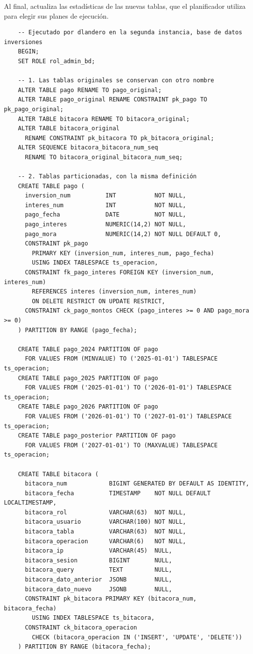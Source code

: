Al final,  actualiza las estadísticas de las nuevas tablas, que el planificador utiliza para elegir sus planes de ejecución.

\begin{verbatim}
	-- Ejecutado por dlandero en la segunda instancia, base de datos inversiones
	BEGIN;
	SET ROLE rol_admin_bd;
	
	-- 1. Las tablas originales se conservan con otro nombre
	ALTER TABLE pago RENAME TO pago_original;
	ALTER TABLE pago_original RENAME CONSTRAINT pk_pago TO pk_pago_original;
	ALTER TABLE bitacora RENAME TO bitacora_original;
	ALTER TABLE bitacora_original
	  RENAME CONSTRAINT pk_bitacora TO pk_bitacora_original;
	ALTER SEQUENCE bitacora_bitacora_num_seq
	  RENAME TO bitacora_original_bitacora_num_seq;
	
	-- 2. Tablas particionadas, con la misma definición
	CREATE TABLE pago (
	  inversion_num          INT           NOT NULL,
	  interes_num            INT           NOT NULL,
	  pago_fecha             DATE          NOT NULL,
	  pago_interes           NUMERIC(14,2) NOT NULL,
	  pago_mora              NUMERIC(14,2) NOT NULL DEFAULT 0,
	  CONSTRAINT pk_pago
	    PRIMARY KEY (inversion_num, interes_num, pago_fecha)
	    USING INDEX TABLESPACE ts_operacion,
	  CONSTRAINT fk_pago_interes FOREIGN KEY (inversion_num, interes_num)
	    REFERENCES interes (inversion_num, interes_num)
	    ON DELETE RESTRICT ON UPDATE RESTRICT,
	  CONSTRAINT ck_pago_montos CHECK (pago_interes >= 0 AND pago_mora >= 0)
	) PARTITION BY RANGE (pago_fecha);
	
	CREATE TABLE pago_2024 PARTITION OF pago
	  FOR VALUES FROM (MINVALUE) TO ('2025-01-01') TABLESPACE ts_operacion;
	CREATE TABLE pago_2025 PARTITION OF pago
	  FOR VALUES FROM ('2025-01-01') TO ('2026-01-01') TABLESPACE ts_operacion;
	CREATE TABLE pago_2026 PARTITION OF pago
	  FOR VALUES FROM ('2026-01-01') TO ('2027-01-01') TABLESPACE ts_operacion;
	CREATE TABLE pago_posterior PARTITION OF pago
	  FOR VALUES FROM ('2027-01-01') TO (MAXVALUE) TABLESPACE ts_operacion;
	
	CREATE TABLE bitacora (
	  bitacora_num            BIGINT GENERATED BY DEFAULT AS IDENTITY,
	  bitacora_fecha          TIMESTAMP    NOT NULL DEFAULT LOCALTIMESTAMP,
	  bitacora_rol            VARCHAR(63)  NOT NULL,
	  bitacora_usuario        VARCHAR(100) NOT NULL,
	  bitacora_tabla          VARCHAR(63)  NOT NULL,
	  bitacora_operacion      VARCHAR(6)   NOT NULL,
	  bitacora_ip             VARCHAR(45)  NULL,
	  bitacora_sesion         BIGINT       NULL,
	  bitacora_query          TEXT         NULL,
	  bitacora_dato_anterior  JSONB        NULL,
	  bitacora_dato_nuevo     JSONB        NULL,
	  CONSTRAINT pk_bitacora PRIMARY KEY (bitacora_num, bitacora_fecha)
	    USING INDEX TABLESPACE ts_bitacora,
	  CONSTRAINT ck_bitacora_operacion
	    CHECK (bitacora_operacion IN ('INSERT', 'UPDATE', 'DELETE'))
	) PARTITION BY RANGE (bitacora_fecha);
	

\end{verbatim}
